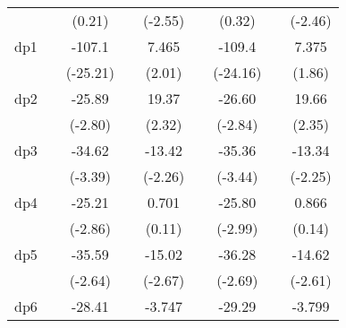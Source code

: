 {\begin{tabular}{l*{8}{c}}
            &                     &      (0.21)         &                     &     (-2.55)         &                     &      (0.32)         &                     &     (-2.46)         \\
[1em]
dp1         &                     &      -107.1\sym{***}&                     &       7.465\sym{*}  &                     &      -109.4\sym{***}&                     &       7.375         \\
            &                     &    (-25.21)         &                     &      (2.01)         &                     &    (-24.16)         &                     &      (1.86)         \\
[1em]
dp2         &                     &      -25.89\sym{**} &                     &       19.37\sym{*}  &                     &      -26.60\sym{**} &                     &       19.66\sym{*}  \\
            &                     &     (-2.80)         &                     &      (2.32)         &                     &     (-2.84)         &                     &      (2.35)         \\
[1em]
dp3         &                     &      -34.62\sym{***}&                     &      -13.42\sym{*}  &                     &      -35.36\sym{***}&                     &      -13.34\sym{*}  \\
            &                     &     (-3.39)         &                     &     (-2.26)         &                     &     (-3.44)         &                     &     (-2.25)         \\
[1em]
dp4         &                     &      -25.21\sym{**} &                     &       0.701         &                     &      -25.80\sym{**} &                     &       0.866         \\
            &                     &     (-2.86)         &                     &      (0.11)         &                     &     (-2.99)         &                     &      (0.14)         \\
[1em]
dp5         &                     &      -35.59\sym{**} &                     &      -15.02\sym{**} &                     &      -36.28\sym{**} &                     &      -14.62\sym{**} \\
            &                     &     (-2.64)         &                     &     (-2.67)         &                     &     (-2.69)         &                     &     (-2.61)         \\
[1em]
dp6         &                     &      -28.41\sym{**} &                     &      -3.747         &                     &      -29.29\sym{**} &                     &      -3.799         \\

\end{tabular}}
